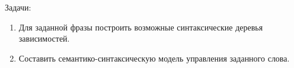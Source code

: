 \documentclass[a4paper]{article}
\begin{document}
Задачи:
\begin{enumerate}
	\item Для заданной фразы построить возможные синтаксические деревья зависимостей.
	\item Составить семантико-синтаксическую модель управления заданного слова.
\end{enumerate}



\end{document}
